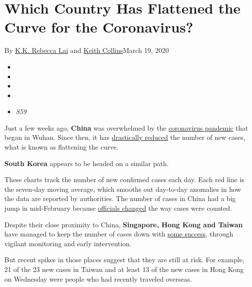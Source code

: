 \hypertarget{which-country-has-flattened-the-curve-for-the-coronavirus}{%
\section{Which Country Has Flattened the Curve for the
Coronavirus?}\label{which-country-has-flattened-the-curve-for-the-coronavirus}}

By \href{https://www.nytimes3xbfgragh.onion/by/kk-rebecca-lai}{K.K.
Rebecca Lai} and
\href{https://www.nytimes3xbfgragh.onion/by/keith-collins}{Keith
Collins}March 19, 2020

\begin{itemize}
\item
\item
\item
\item
\item
  \emph{859}
\end{itemize}

Just a few weeks ago, \textbf{China} was overwhelmed by the
\href{https://www.nytimes3xbfgragh.onion/interactive/2020/world/coronavirus-maps.html}{coronavirus
pandemic} that began in Wuhan. Since then, it has
\href{https://www.nytimes3xbfgragh.onion/2020/03/18/world/asia/coronavirus-china-aid.html}{drastically
reduced} the number of new cases, what is known as flattening the curve.

\textbf{South Korea} appears to be headed on a similar path.

These charts track the number of new confirmed cases each day. Each red
line is the seven-day moving average, which smooths out day-to-day
anomalies in how the data are reported by authorities. The number of
cases in China had a big jump in mid-February because
\href{https://www.nytimes3xbfgragh.onion/2020/02/13/world/asia/coronavirus-numbers-explain.html}{officials
changed} the way cases were counted.

Despite their close proximity to China, \textbf{Singapore, Hong Kong and
Taiwan} have managed to keep the number of cases down with
\href{https://www.nytimes3xbfgragh.onion/2020/03/17/world/asia/coronavirus-singapore-hong-kong-taiwan.html}{some
success}, through vigilant monitoring and early intervention.

But recent spikes in those places suggest that they are still at risk.
For example, 21 of the 23 new cases in Taiwan and at least 13 of the new
cases in Hong Kong on Wednesday were people who had recently traveled
overseas.

